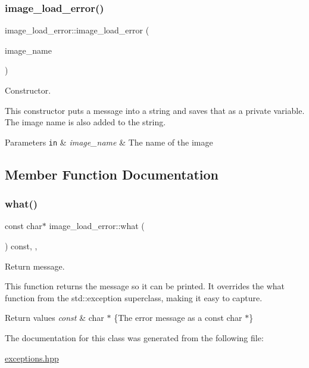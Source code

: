 \subsubsection{\texorpdfstring{image\+\_\+load\+\_\+error()}{image\_load\_error()}}
{\footnotesize\ttfamily image\+\_\+load\+\_\+error\+::image\+\_\+load\+\_\+error (\begin{DoxyParamCaption}\item[{const std\+::string \&}]{image\+\_\+name }\end{DoxyParamCaption})\hspace{0.3cm}{\ttfamily [inline]}}



Constructor. 

This constructor puts a message into a string and saves that as a private variable. The image name is also added to the string.


\begin{DoxyParams}[1]{Parameters}
\mbox{\tt in}  & {\em image\+\_\+name} & The name of the image \\
\hline
\end{DoxyParams}


\subsection{Member Function Documentation}
\mbox{\label{classimage__load__error_ab73fa8f110ff313005a7bb0ed66fd880}} 
\subsubsection{\texorpdfstring{what()}{what()}}
{\footnotesize\ttfamily const char$\ast$ image\+\_\+load\+\_\+error\+::what (\begin{DoxyParamCaption}{ }\end{DoxyParamCaption}) const\hspace{0.3cm}{\ttfamily [inline]}, {\ttfamily [override]}, {\ttfamily [noexcept]}}



Return message. 

This function returns the message so it can be printed. It overrides the what function from the std\+::exception superclass, making it easy to capture.


\begin{DoxyRetVals}{Return values}
{\em const} & char $\ast$ \{The error message as a const char $\ast$\} \\
\hline
\end{DoxyRetVals}


The documentation for this class was generated from the following file\+:\begin{DoxyCompactItemize}
\item 
\hyperlink{exceptions_8hpp}{exceptions.\+hpp}\end{DoxyCompactItemize}
